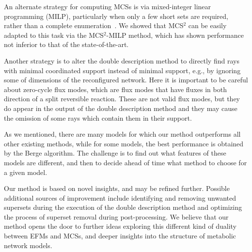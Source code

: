 \documentclass{bioinfo}
\theoremstyle{plain}
\theoremstyle{definition}
\begin{document}
An alternate strategy for computing MCSs is via mixed-integer linear programming (MILP), particularly when only a few short sets are required, rather than a complete enumeration~\cite{ MILP-app1, MILP-app2}. We showed that MCS$^2$ can be easily adapted to this task via the MCS$^2$-MILP method, which has shown performance not inferior to that of the state-of-the-art.

Another strategy is to alter the double description method to directly find rays with minimal coordinated support instead of minimal support, e.g., by ignoring some of dimensions of the reconfigured network. Here it is important to be careful about zero-cycle flux modes, which are flux modes that have fluxes in both direction of a split reversible reaction. These are not valid flux modes, but they do appear in the output of the double description method \cite{Gagneur} and they may cause the omission of some rays which contain them in their support. %

As we mentioned, there are many models for which our method outperforms all other existing methods, while for some models, the best performance is obtained by the Berge algorithm. The challenge is to find out what features of these models are different, and then to decide ahead of time what method to choose for a given model.

Our method is based on novel insights, and may be refined further. Possible additional sources of improvement include identifying and removing unwanted supersets during the execution of the double description method and optimizing the process of superset removal during post-processing. We believe that our method opens the door to further ideas exploring this different kind of duality between EFMs and MCSs, and deeper insights into the structure of metabolic network models.
\vspace{-0.5cm}
    
\end{document}
